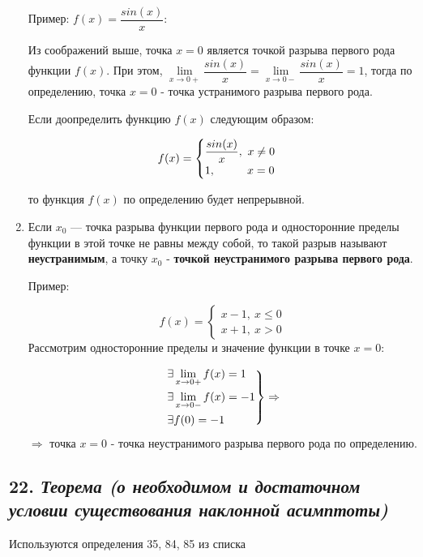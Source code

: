 \begin{enumerate}
Пример: $f(x) = {\dfrac{sin(x)}{x}}$:

Из соображений выше, точка $x = 0$ является точкой разрыва первого рода функции $f(x)$. При этом, $\lim\limits_{x \to 0+}{\dfrac{sin(x)}{x}} = \lim\limits_{x \to 0-}{\dfrac{sin(x)}{x}} = 1$, тогда по определению, точка $x = 0$ - точка устранимого разрыва первого рода.

Если доопределить функцию $f(x)$ следующим образом:

$$f(x) = 
    \begin{cases}
        {\dfrac{sin(x)}{x}},\ x \neq 0\\
        1, \hspace*{28pt} x = 0
    \end{cases}
    $$

то функция $f(x)$ по определению будет непрерывной.
\item Если $x_0$ — точка разрыва функции первого рода и односторонние пределы функции в этой точке не равны между собой, то такой разрыв называют \textbf{неустранимым}, а точку $x_0$ - \textbf{точкой неустранимого разрыва первого рода}.

Пример:

$$f(x) = 
    \begin{cases}
        x - 1,\ x \leqslant 0\\
        x + 1, \  x > 0
    \end{cases}
    $$ Рассмотрим односторонние пределы и значение функции в точке $x = 0$:

$$\begin{rcases}
        \exists\lim\limits_{x \rightarrow 0+}f(x) = 1\\
        \exists\lim\limits_{x \rightarrow 0-}f(x) = -1\\
        \exists f(0) = -1
    \end{rcases} 
    \Rightarrow
    $$

$$\Rightarrow \text{ точка }x = 0 \text{ - точка неустранимого разрыва первого рода по определению.}
    $$

\end{enumerate}
\newpage 
\subsection*{22. \textit{Теорема (о необходимом и достаточном условии существования наклонной асимптоты)}}
\begin{Quote2} 
\small\centering 

Используются определения 35, 84, 85 из списка \end{Quote2} 

